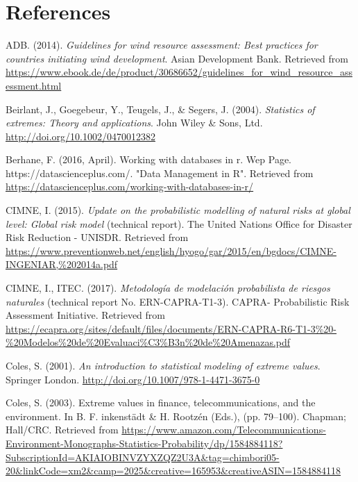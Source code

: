 \documentclass[12pt,oneside]{reedthesis}
\begin{document}
\backmatter

\hypertarget{references}{%
\chapter*{References}\label{references}}


\noindent

\setlength{\parindent}{-0.20in}
\setlength{\leftskip}{0.20in}
\setlength{\parskip}{8pt}

\hypertarget{refs}{}
\leavevmode\hypertarget{ref-windassessment}{}%
ADB. (2014). \emph{Guidelines for wind resource assessment: Best practices for countries initiating wind development}. Asian Development Bank. Retrieved from \url{https://www.ebook.de/de/product/30686652/guidelines_for_wind_resource_assessment.html}

\leavevmode\hypertarget{ref-Beirlant2004}{}%
Beirlant, J., Goegebeur, Y., Teugels, J., \& Segers, J. (2004). \emph{Statistics of extremes: Theory and applications}. John Wiley \& Sons, Ltd. \url{http://doi.org/10.1002/0470012382}

\leavevmode\hypertarget{ref-databasesinr}{}%
Berhane, F. (2016, April). Working with databases in r. Wep Page. https://datascienceplus.com/. "Data Management in R". Retrieved from \url{https://datascienceplus.com/working-with-databases-in-r/}

\leavevmode\hypertarget{ref-hurricanemaps}{}%
CIMNE, I. (2015). \emph{Update on the probabilistic modelling of natural risks at global level: Global risk model} (technical report). The United Nations Office for Disaster Risk Reduction - UNISDR. Retrieved from \url{https://www.preventionweb.net/english/hyogo/gar/2015/en/bgdocs/CIMNE-INGENIAR,\%202014a.pdf}

\leavevmode\hypertarget{ref-hurricanemaps2}{}%
CIMNE, I., ITEC. (2017). \emph{Metodología de modelación probabilista de riesgos naturales} (technical report No. ERN-CAPRA-T1-3). CAPRA- Probabilistic Risk Assessment Initiative. Retrieved from \url{https://ecapra.org/sites/default/files/documents/ERN-CAPRA-R6-T1-3\%20-\%20Modelos\%20de\%20Evaluaci\%C3\%B3n\%20de\%20Amenazas.pdf}

\leavevmode\hypertarget{ref-Coles2001}{}%
Coles, S. (2001). \emph{An introduction to statistical modeling of extreme values}. Springer London. \url{http://doi.org/10.1007/978-1-4471-3675-0}

\leavevmode\hypertarget{ref-Coles2003}{}%
Coles, S. (2003). Extreme values in finance, telecommunications, and the environment. In B. F. inkenstädt \& H. Rootzén (Eds.), (pp. 79--100). Chapman; Hall/CRC. Retrieved from \url{https://www.amazon.com/Telecommunications-Environment-Monographs-Statistics-Probability/dp/1584884118?SubscriptionId=AKIAIOBINVZYXZQZ2U3A\&tag=chimbori05-20\&linkCode=xm2\&camp=2025\&creative=165953\&creativeASIN=1584884118}
\end{document}
